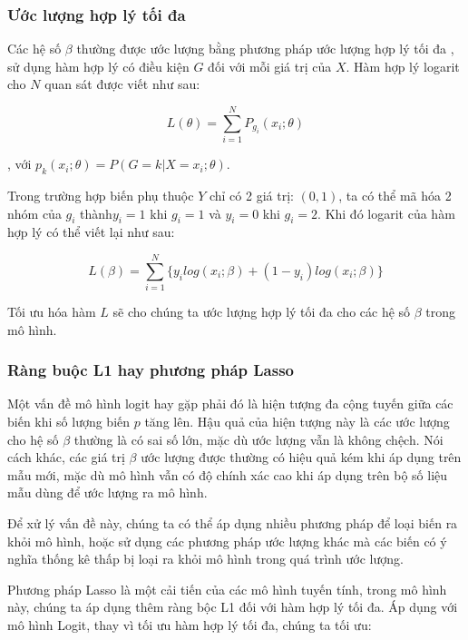 \documentclass[a4paper]{report}\usepackage[]{graphicx}\usepackage[]{color}
\begin{document}
\subsubsection{Ước lượng hợp lý tối đa}


Các hệ số $\beta$ thường được ước lượng bằng phương pháp ước lượng hợp lý tối đa \parencite{hosmer2013applied}, sử dụng hàm hợp lý có điều kiện $G$ đối với mỗi giá trị của $X$. Hàm hợp lý logarit cho $N$ quan sát được viết như sau:

{\large

$$
L(\theta) = \sum_{i = 1}^N P_{g_i} (x_i; \theta)
$$
}
, với $p_k(x_i;\theta) = P(G = k|X = x_i; \theta)$.

Trong trường hợp biến phụ thuộc $Y$ chỉ có 2 giá trị: $(0, 1)$, ta có thể mã hóa 2 nhóm của $g_i$ thành$y_i = 1$ khi $g_i = 1$ và $y_i = 0$ khi $g_i = 2$. Khi đó logarit của hàm hợp lý có thể viết lại như  sau: 

{\large
$$
L(\beta) = \sum_{i = 1}^N \{  y_i log (x_i ; \beta) + (1- y_i)log (x_i; \beta) \}
$$
}

Tối ưu hóa hàm $L$ sẽ cho chúng ta ước lượng hợp lý tối đa cho các hệ số $\beta$ trong mô hình.

\subsubsection{Ràng buộc L1 hay phương pháp Lasso}

Một vấn đề mô hình logit hay gặp phải đó là hiện tượng đa cộng tuyến giữa các biến khi số lượng biến $p$ tăng lên. Hậu quả của hiện tượng này là các ước lượng cho hệ số $\beta$ thường là có sai số lớn, mặc dù ước lượng vẫn là không chệch. Nói cách khác, các giá trị $\beta$ ước lượng được thường có hiệu quả kém khi áp dụng trên mẫu mới, mặc dù mô hình vẫn có độ chính xác cao khi áp dụng trên bộ số liệu mẫu dùng để ước lượng ra mô hình. 

Để xử lý vấn đề này, chúng ta có thể áp dụng nhiều phương pháp để loại biến ra khỏi mô hình, hoặc sử dụng các phương pháp ước lượng khác mà các biến có ý nghĩa thống kê thấp bị loại ra khỏi mô hình trong quá trình ước lượng.

Phương pháp Lasso là một cải tiến của các mô hình tuyến tính, trong mô hình này, chúng ta áp dụng thêm ràng bộc L1 đối với hàm hợp lý tối đa. Áp dụng với mô hình Logit, thay vì tối ưu hàm hợp lý tối đa, chúng ta tối ưu:
\end{document}

